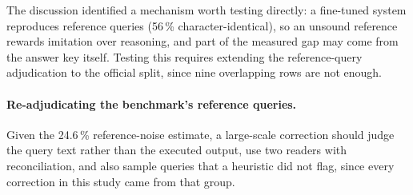 The discussion identified a mechanism worth testing directly: a fine-tuned system reproduces reference queries (56\,\% character-identical), so an unsound reference rewards imitation over reasoning, and part of the measured gap may come from the answer key itself.
Testing this requires extending the reference-query adjudication to the official split, since nine overlapping rows are not enough.

\paragraph{Re-adjudicating the benchmark's reference
queries.}

Given the 24.6\,\% reference-noise estimate, a large-scale correction should judge the query text rather than the executed output, use two readers with reconciliation, and also sample queries that a heuristic did not flag, since every correction in this study came from that group.
